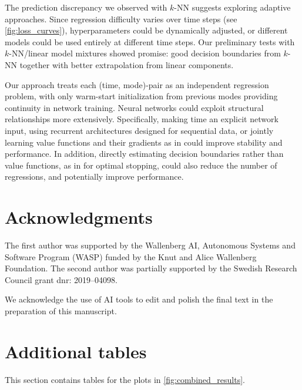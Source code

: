 \documentclass[11pt,reqno,a4paper]{amsart}
\theoremstyle{definition}
\numberwithin{equation}{section}
\DeclareMathOperator{\1}{\mathbbm{1}}
\begin{document}
The prediction discrepancy we observed with $k$-NN suggests exploring adaptive approaches. Since regression difficulty varies over time steps (see \cref{fig:loss_curves}), hyperparameters could be dynamically adjusted, or different models could be used entirely at different time steps. Our preliminary tests with $k$-NN/linear model mixtures showed promise: good decision boundaries from $k$-NN together with better extrapolation from linear components.

Our approach treats each (time, mode)-pair as an independent regression problem, with only warm-start initialization from previous modes providing continuity in network training. Neural networks could exploit structural relationships more extensively. Specifically, making time an explicit network input, using recurrent architectures designed for sequential data, or jointly learning value functions and their gradients as in \cite{hure2020deep,bayraktar2023neural} could improve stability and performance. In addition, directly estimating decision boundaries rather than value functions, as in \cite{reppen2025neural} for optimal stopping, could also reduce the number of regressions, and potentially improve performance.

\section*{Acknowledgments}
The first author was supported by the Wallenberg AI, Autonomous
Systems and Software Program (WASP) funded by the Knut and Alice Wallenberg Foundation.
The second author was partially supported by the Swedish Research Council grant dnr: 2019--04098.

We acknowledge the use of AI tools to edit and polish the final text in the preparation of this manuscript.
\printbibliography

\clearpage

\appendix

\section{Additional tables}\label{sec:tables}
This section contains tables for the plots in \cref{fig:combined_results}.
\end{document}
